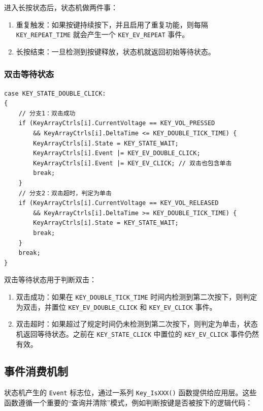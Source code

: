 进入长按状态后，状态机做两件事：

\begin{enumerate}
\item 重复触发：如果按键持续按下，并且启用了重复功能，则每隔 \texttt{KEY\_REPEAT\_TIME} 就会产生一个 \texttt{KEY\_EV\_REPEAT} 事件。
\item 长按结束：一旦检测到按键释放，状态机就返回初始等待状态。
\end{enumerate}

\subsubsection{双击等待状态}

\begin{lstlisting}[style=c]
case KEY_STATE_DOUBLE_CLICK:
{
    // 分支1：双击成功
    if (KeyArrayCtrls[i].CurrentVoltage == KEY_VOL_PRESSED
        && KeyArrayCtrls[i].DeltaTime <= KEY_DOUBLE_TICK_TIME) {
        KeyArrayCtrls[i].State = KEY_STATE_WAIT;
        KeyArrayCtrls[i].Event |= KEY_EV_DOUBLE_CLICK;
        KeyArrayCtrls[i].Event |= KEY_EV_CLICK; // 双击也包含单击
        break;
    }
    // 分支2：双击超时，判定为单击
    if (KeyArrayCtrls[i].CurrentVoltage == KEY_VOL_RELEASED
        && KeyArrayCtrls[i].DeltaTime >= KEY_DOUBLE_TICK_TIME) {
        KeyArrayCtrls[i].State = KEY_STATE_WAIT;
        break;
    }
    break;
}
\end{lstlisting}

双击等待状态用于判断双击：

\begin{enumerate}
\item 双击成功：如果在 \texttt{KEY\_DOUBLE\_TICK\_TIME} 时间内检测到第二次按下，则判定为双击，并置位 \texttt{KEY\_EV\_DOUBLE\_CLICK} 和 \texttt{KEY\_EV\_CLICK} 事件。
\item 双击超时：如果超过了规定时间仍未检测到第二次按下，则判定为单击，状态机返回等待状态。之前在 \texttt{KEY\_STATE\_CLICK} 中置位的 \texttt{KEY\_EV\_CLICK} 事件仍然有效。
\end{enumerate}

\subsection{事件消费机制}

状态机产生的 \texttt{Event} 标志位，通过一系列 \texttt{Key\_IsXXX()} 函数提供给应用层。这些函数遵循一个重要的“查询并清除”模式，例如判断按键是否被按下的逻辑代码：


